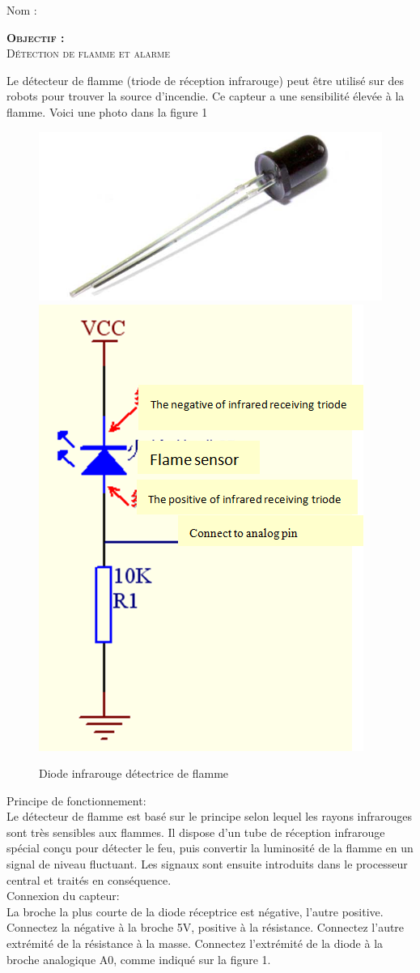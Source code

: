\documentclass[a4paper, 11pt]{article}           %
\newcommand{\objectif}[1]{\textsc{\huge \textbf{Objectif :}\\[2mm] #1} }
\begin{document}
\sffamily
\hfill Nom : {\noindent\makebox[5cm]{\dotfill}\endgraf}

\objectif{Détection de flamme et alarme}

Le détecteur de flamme (triode de réception infrarouge) peut être utilisé sur des robots pour trouver la source d'incendie. Ce capteur a une sensibilité élevée à la flamme. Voici une photo dans la figure 1
\begin{figure}[!h]
\begin{center}
\includegraphics[width=.5\textwidth]{detecteur_flamme}
\includegraphics[width=.3\textwidth]{DiodeCircuit}
\label{FigDiodeFlamme}
\caption{Diode infrarouge détectrice de flamme}
\end{center}
\end{figure}


Principe de fonctionnement:\\
Le détecteur de flamme est basé sur le principe selon lequel les rayons infrarouges sont très sensibles aux flammes. Il dispose d'un tube de réception infrarouge spécial conçu pour détecter le feu, puis convertir la luminosité de la flamme en un signal de niveau fluctuant. Les signaux sont ensuite introduits dans le processeur central et traités en conséquence.\\

Connexion du capteur:\\
La broche la plus courte de la diode réceptrice est négative, l'autre positive. Connectez la négative à la broche 5V, positive à la résistance. Connectez l'autre extrémité de la résistance à la masse. Connectez l'extrémité de la diode à la broche analogique A0, comme indiqué sur la figure 1.\\
\end{document}

